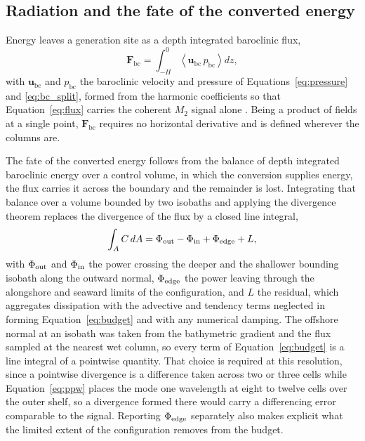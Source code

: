 \documentclass[a4paper,fleqn]{cas-sc}
\newcommand{\bc}{\mathrm{bc}}
\begin{document}
\subsection{Radiation and the fate of the converted energy}
\label{sec:fate}

Energy leaves a generation site as a depth integrated baroclinic flux,
\begin{equation}
\mathbf{F}_{\bc}=\int_{-H}^{0}\left\langle \mathbf{u}_{\bc}\,p_{\bc}\right\rangle dz ,
\label{eq:flux}
\end{equation}
with $\mathbf{u}_{\bc}$ and $p_{\bc}$ the baroclinic velocity and pressure of Equations~\ref{eq:pressure} and \ref{eq:bc_split}, formed from the harmonic coefficients so that Equation~\ref{eq:flux} carries the coherent $M_{2}$ signal alone \citep{kelly:2010,nash_alford:2005}. Being a product of fields at a single point, $\mathbf{F}_{\bc}$ requires no horizontal derivative and is defined wherever the columns are.

The fate of the converted energy follows from the balance of depth integrated baroclinic energy over a control volume, in which the conversion supplies energy, the flux carries it across the boundary and the remainder is lost. Integrating that balance over a volume bounded by two isobaths and applying the divergence theorem replaces the divergence of the flux by a closed line integral,
\begin{equation}
\int_{A}C\,dA=\Phi_{\rm out}-\Phi_{\rm in}+\Phi_{\rm edge}+L ,
\label{eq:budget}
\end{equation}
with $\Phi_{\rm out}$ and $\Phi_{\rm in}$ the power crossing the deeper and the shallower bounding isobath along the outward normal, $\Phi_{\rm edge}$ the power leaving through the alongshore and seaward limits of the configuration, and $L$ the residual, which aggregates dissipation with the advective and tendency terms neglected in forming Equation~\ref{eq:budget} and with any numerical damping. The offshore normal at an isobath was taken from the bathymetric gradient and the flux sampled at the nearest wet column, so every term of Equation~\ref{eq:budget} is a line integral of a pointwise quantity. That choice is required at this resolution, since a pointwise divergence is a difference taken across two or three cells while Equation~\ref{eq:ppw} places the mode one wavelength at eight to twelve cells over the outer shelf, so a divergence formed there would carry a differencing error comparable to the signal. Reporting $\Phi_{\rm edge}$ separately also makes explicit what the limited extent of the configuration removes from the budget.
\end{document}
